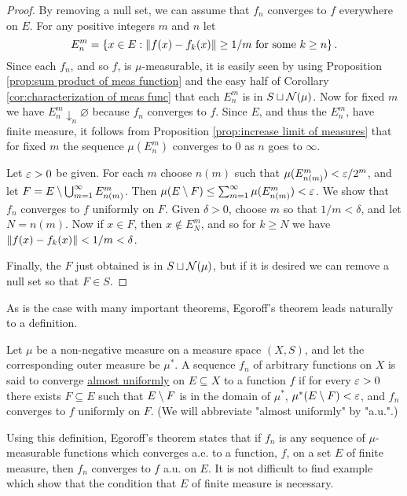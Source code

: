 \begin{proof}
By removing a null set, we can assume that $f_n$ converges to $f$ everywhere on $E$. For any positive integers $m$ and $n$ let $$E_n^m=\left\{x \in E:\norm{f(x)-f_k(x)} \geq 1/m \text { for some } k \geq n\right\}.$$ Since each $f_n$, and so $f$, is $\mu$-measurable, it is easily seen by using Proposition \ref{prop:sum product of meas function} and the easy half of Corollary \ref{cor:characterization of meas func} that each $E_n^m$ is in $S \sqcup {\cal N}(\mu)$. Now for fixed $m$ we have $E_n^m\downarrow_n\varnothing$ because $f_n$ converges to $f$. Since $E$, and thus the $E_n^m$, have finite measure, it follows from Proposition \ref{prop:increase limit of measures} that for fixed $m$ the sequence $\mu(E_n^m)$ converges to $0$ as $n$ goes to $\infty$.

Let $\varepsilon>0$ be given. For each $m$ choose $n(m)$ such that $\mu(E_{n(m)}^m)<\varepsilon/2^m$, and let $F=E\setminus\bigcup_{m=1}^\infty E_{n(m)}^m$. Then $\mu(E\setminus F)\leq\sum_{m=1}^\infty\mu(E_{n(m)}^m)<\varepsilon$. We show that $f_n$ converges to $f$ uniformly on $F$. Given $\delta>0$, choose $m$ so that $1/m<\delta$, and let $N=n(m)$. Now if $x\in F$, then $x\notin E_N^m$, and so for $k\geq N$ we have $\norm{f(x)-f_k(x)}<1/m<\delta$.

Finally, the $F$ just obtained is in $S\sqcup{\cal N}(\mu)$, but if it is desired we can remove a null set so that $F\in S$.
\end{proof}

As is the case with many important theorems, Egoroff's theorem leads naturally to a definition.

\begin{definition}
Let $\mu$ be a non-negative measure on a measure space $(X,S)$, and let the corresponding outer measure be $\mu^*$. A sequence $f_n$ of arbitrary functions on $X$ is said to converge \underline{almost uniformly} on $E\subseteq X$ to a function $f$ if for every $\varepsilon>0$ there exists $F\subseteq E$ such that $E\setminus F$ is in the domain of $\mu^*$, $\mu^*(E\setminus F)<\varepsilon$, and $f_n$ converges to $f$ uniformly on $F$. (We will abbreviate "almost uniformly" by "a.u.".)
\end{definition}

Using this definition, Egoroff's theorem states that if $f_n$ is any sequence of $\mu$-measurable functions which converges a.e. to a function, $f$, on a set $E$ of finite measure, then $f_n$ converges to $f$ a.u. on $E$. It is not difficult to find example which show that the condition that $E$ of finite measure is necessary.

